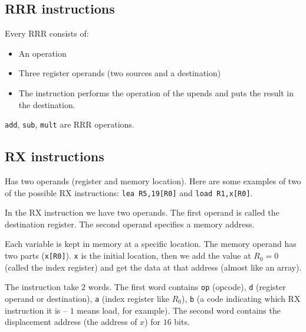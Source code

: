 \subsection{RRR instructions}\label{sub:rrr_instructions}

Every RRR consists of:
\begin{itemize}
    \item An operation
    \item Three register operands (two sources and a destination)
    \item The instruction performs the operation of the upends and puts the result in the destination.
\end{itemize}

\texttt{add}, \texttt{sub}, \texttt{mult} are RRR operations.

\subsection{RX instructions}\label{sub:rx_instructions}

Has two operands (register and memory location).
Here are some examples of two of the possible RX instructions:
\texttt{lea R5,19[R0]} and \texttt{load R1,x[R0]}.

In the RX instruction we have two operands.
The first operand is called the destination register.
The second operand specifies a memory address.

Each variable is kept in memory at a specific location.
The memory operand has two parts (\texttt{x[R0]}).
\texttt{x} is the initial location, then we add the value at \(R_0 = 0\) (called the index register) and get the data at that address (almost like an array).

The instruction take \(2\) words.
The first word contains \texttt{op} (opcode), \texttt{d} (register operand or destination), \texttt{a} (index register like \(R_0\)), \texttt{b} (a code indicating which RX instruction it is -- \(1\) means load, for example).
The second word contains the displacement address (the address of \(x\)) for \(16\) bits.
